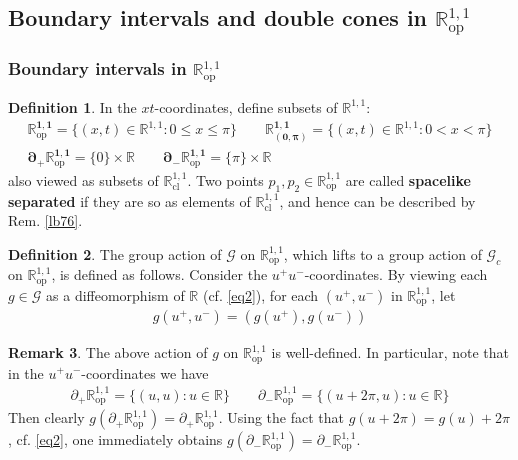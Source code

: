 \documentclass[11pt,b5paper,notitlepage]{article}
\theoremstyle{definition}
\newtheorem{df}{Definition}[section]
\newtheorem{rem}[df]{Remark}
\theoremstyle{plain}
\newcommand{\Rbb}{\mathbb R}
\newcommand{\Gc}{\mathscr G_c}
\newcommand{\SG}{\mathscr G}
\newcommand{\Roo}{\mathbb R^{1,1}}
\newcommand{\Rcl}{\mathbb R^{1,1}_{\mathrm{cl}}}
\newcommand{\Rop}{\mathbb R^{1,1}_{\mathrm{op}}}
\newcommand{\Rzp}{\mathbb R^{1,1}_{(0,\pi)}}
\numberwithin{equation}{section}
\begin{document}
\subsection{Boundary intervals and double cones in $\Rop$}


\subsubsection{Boundary intervals in $\Rop$}

\begin{df}
In the $xt$-coordinates, define subsets of $\Roo$:
\begin{gather*}
\pmb{\Rop}=\{(x,t)\in\Roo:0\leq x\leq\pi\}\qquad \pmb{\Rzp}=\{(x,t)\in\Roo:0< x<\pi\}\\ 
\pmb{\partial_+\Rop}=\{0\}\times\Rbb\qquad\pmb{\partial_-\Rop}=\{\pi\}\times\Rbb
\end{gather*}
also viewed as subsets of $\Rcl$. Two points $p_1,p_2\in\Rop$ are called \textbf{spacelike separated} if they are so as elements of $\Rcl$, and hence can be described by Rem. \ref{lb76}.
\end{df}


\begin{df}\label{lb110}
The group action of $\SG$ on $\Rop$, which lifts to a group action of $\Gc$ on $\Rop$, is defined as follows. Consider the $u^+u^-$-coordinates. By viewing each $g\in\SG$ as a diffeomorphism of $\Rbb$ (cf. \eqref{eq2}), for each $(u^+,u^-)$ in $\Rop$, let
\begin{align*}
g(u^+,u^-)=(g(u^+),g(u^-))
\end{align*}
\end{df}

\begin{rem}\label{lb111}
The above action of $g$ on $\Rop$ is well-defined. In particular, note that in the $u^+u^-$-coordinates we have
\begin{align}\label{eq48}
\partial_+\Rop=\{(u,u):u\in\Rbb\}\qquad \partial_-\Rop=\{(u+2\pi,u):u\in\Rbb\}
\end{align}
Then clearly $g(\partial_+\Rop)=\partial_+\Rop$. Using the fact that $g(u+2\pi)=g(u)+2\pi$, cf. \eqref{eq2}, one immediately obtains $g(\partial_-\Rop)=\partial_-\Rop$.
\end{rem}
\end{document}
